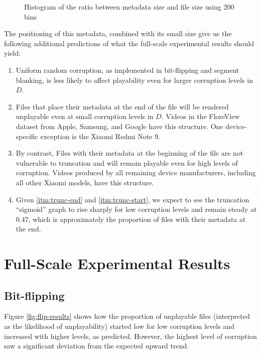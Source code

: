 \begin{figure}
    \centering
    
    \caption{Histogram of the ratio between metadata size and file size using 200 bins}
    \label{fig:moov-hist}
\end{figure}

The positioning of this metadata, combined with its small size give us the following additional predictions of what the full-scale experimental results should yield:

\begin{enumerate}
    \item Uniform random corruption, as implemented in bit-flipping and segment blanking, is less likely to affect playability even for larger corruption levels in \( D \).
    \item \label{itm:trunc-end} Files that place their metadata at the end of the file will be rendered unplayable even at small corruption levels in \( D \). Videos in the FloreView dataset from Apple, Samsung, and Google have this structure. One device-specific exception is the Xiaomi Redmi Note 9.
    \item \label{itm:trunc-start} By contrast, Files with their metadata at the beginning of the file are not vulnerable to truncation and will remain playable even for high levels of corruption. Videos produced by all remaining device manufacturers, including all other Xiaomi models, have this structure.
    \item Given \ref{itm:trunc-end} and \ref{itm:trunc-start}, we expect to see the truncation ``sigmoid'' graph to rise sharply for low corruption levels and remain steady at 0.47, which is approximately the proportion of files with their metadata at the end.
\end{enumerate}

\section{Full-Scale Experimental Results}

\subsection{Bit-flipping}

Figure \ref{fig:flip-results} shows how the proportion of unplayable files (interpreted as the likelihood of unplayability) started low for low corruption levels and increased with higher levels, as predicted. However, the highest level of corruption saw a significant deviation from the expected upward trend.

